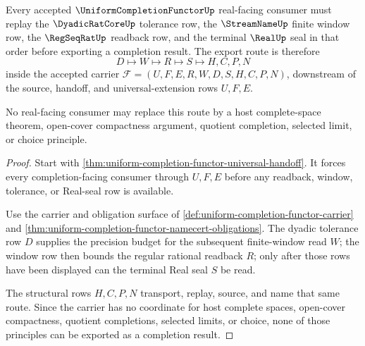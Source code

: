 \begin{theorem}
\label{thm:uniform-completion-functor-real-seal-route}
Every accepted $\UniformCompletionFunctorUp$ real-facing consumer must replay the $\DyadicRatCoreUp$ tolerance row, the $\StreamNameUp$ finite window row, the $\RegSeqRatUp$ readback row, and the terminal $\RealUp$ seal in that order before exporting a completion result. The export route is therefore
$$
D \longmapsto W \longmapsto R \longmapsto S \longmapsto H,C,P,N
$$
inside the accepted carrier $\mathcal{F}=(U,F,E,R,W,D,S,H,C,P,N)$, downstream of the source, handoff, and universal-extension rows $U,F,E$.

No real-facing consumer may replace this route by a host complete-space theorem, open-cover compactness argument, quotient completion, selected limit, or choice principle.
\end{theorem}
\begin{proof}
Start with \autoref{thm:uniform-completion-functor-universal-handoff}. It forces every completion-facing consumer through $U,F,E$ before any readback, window, tolerance, or Real-seal row is available.

Use the carrier and obligation surface of \autoref{def:uniform-completion-functor-carrier} and \autoref{thm:uniform-completion-functor-namecert-obligations}. The dyadic tolerance row $D$ supplies the precision budget for the subsequent finite-window read $W$; the window row then bounds the regular rational readback $R$; only after those rows have been displayed can the terminal Real seal $S$ be read.

The structural rows $H,C,P,N$ transport, replay, source, and name that same route. Since the carrier has no coordinate for host complete spaces, open-cover compactness, quotient completions, selected limits, or choice, none of those principles can be exported as a completion result.
\end{proof}

